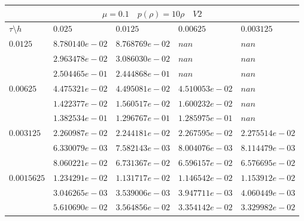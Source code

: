 \documentclass[a4paper,12pt]{extarticle}
\begin{document}
\begin{tabular}{|l|l|l|l|l|}
	\hline
	\multicolumn{5}{|c|}{$\mu =0.1 \quad  p(\rho) =10 \rho \quad V2$}\\
	\hline
	$\tau\setminus h$ & $0.025$ & $0.0125$ & $0.00625$ & $0.003125$\\
	\hline
	$0.0125$  & $8.780140e-02$ & $8.768769e-02$ & $nan$ & $nan$\\
	& $2.963478e-02$ & $3.086030e-02$ & $nan$ & $nan$\\
	& $2.504465e-01$ & $2.444868e-01$ & $nan$ & $nan$\\
	\hline
	$0.00625$  & $4.475321e-02$ & $4.495081e-02$ & $4.510053e-02$ & $nan$\\
	& $1.422377e-02$ & $1.560517e-02$ & $1.600232e-02$ & $nan$\\
	& $1.382534e-01$ & $1.296767e-01$ & $1.285975e-01$ & $nan$\\
	\hline
	$0.003125$  & $2.260987e-02$ & $2.244181e-02$ & $2.267595e-02$ & $2.275514e-02$\\
	& $6.330079e-03$ & $7.582143e-03$ & $8.004076e-03$ & $8.114479e-03$\\
	& $8.060221e-02$ & $6.731367e-02$ & $6.596157e-02$ & $6.576695e-02$\\
	\hline
	$0.0015625$  & $1.234291e-02$ & $1.131717e-02$ & $1.146542e-02$ & $1.153912e-02$\\
	& $3.046265e-03$ & $3.539006e-03$ & $3.947711e-03$ & $4.060449e-03$\\
	& $5.610690e-02$ & $3.564856e-02$ & $3.354142e-02$ & $3.329982e-02$\\
	\hline
\end{tabular}
\end{document}
